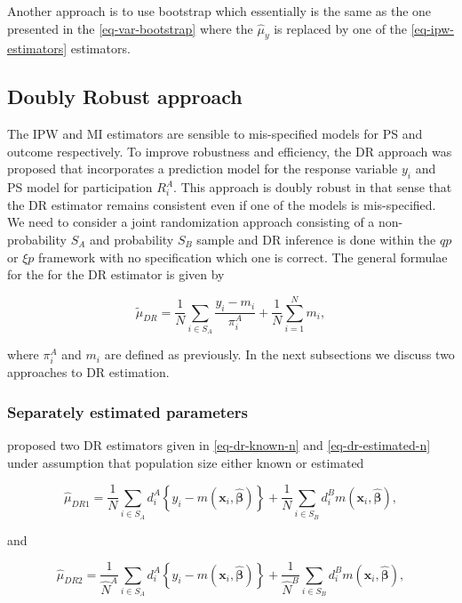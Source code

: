 \documentclass[
]{jss}
\begin{document}
Another approach is to use bootstrap which essentially is the same as
the one presented in the \eqref{eq-var-bootstrap} where the
\(\hat{\mu}_y\) is replaced by one of the \eqref{eq-ipw-estimators}
estimators.

\subsection{Doubly Robust approach}\label{sec-dr-approach}

The IPW and MI estimators are sensible to mis-specified models for PS
and outcome respectively. To improve robustness and efficiency, the DR
approach was proposed that incorporates a prediction model for the
response variable \(y_i\) and PS model for participation \(R_i^A\). This
approach is doubly robust in that sense that the DR estimator remains
consistent even if one of the models is mis-specified. We need to
consider a joint randomization approach consisting of a non-probability
\(S_A\) and probability \(S_B\) sample and DR inference is done within
the \(qp\) or \(\xi p\) framework with no specification which one is
correct. The general formulae for the for the DR estimator is given by

\[
\tilde{\mu}_{DR} = \frac{1}{N}\sum_{i \in S_A}\frac{y_i - m_i}{\pi_i^A} + \frac{1}{N}\sum_{i =1}^N m_i,
\]

where \(\pi_i^A\) and \(m_i\) are defined as previously. In the next
subsections we discuss two approaches to DR estimation.

\subsubsection{Separately estimated
parameters}\label{separately-estimated-parameters}

\citet{chen2020doubly} proposed two DR estimators given in
\eqref{eq-dr-known-n} and \eqref{eq-dr-estimated-n} under assumption
that population size either known or estimated

\begin{equation}
\hat{\mu}_{DR1}=\frac{1}{N} \sum_{i \in S_{A}} d_i^{A}\left\{y_i-m\left(\boldsymbol{x}_i, \hat{\boldsymbol{\beta}}\right)\right\}+\frac{1}{N} \sum_{i \in S_{B}} d_i^{B} m\left(\boldsymbol{x}_i, \hat{\boldsymbol{\beta}}\right),
\label{eq-dr-known-n}
\end{equation}

and

\begin{equation}
\hat{\mu}_{DR2}=\frac{1}{\hat{N}^{A}} \sum_{i \in S_{A}} d_i^{A}\left\{y_i-m\left(\boldsymbol{x}_i, \hat{\boldsymbol{\beta}}\right)\right\}+\frac{1}{\hat{N}^{B}} \sum_{i \in S_{B}} d_i^{B} m\left(\boldsymbol{x}_i, \hat{\boldsymbol{\beta}}\right),
\label{eq-dr-estimated-n}
\end{equation}
\end{document}
